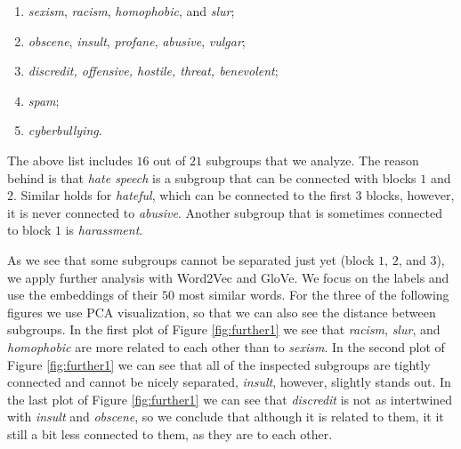 \documentclass[fleqn,moreauthors,10pt]{ds_report}
\begin{document}
\begin{enumerate}
  \item \textit{sexism}, \textit{racism}, \textit{homophobic}, and \textit{slur};
\vspace{-10pt} 
  \item \textit{obscene}, \textit{insult}, \textit{profane}, \textit{abusive}, \textit{vulgar};
\vspace{-10pt}
  \item \textit{discredit, offensive, hostile, threat, benevolent};
\vspace{-10pt}
  \item \textit{spam};
\vspace{-10pt}
  \item \textit{cyberbullying}.
\end{enumerate}

The above list includes $16$ out of $21$ subgroups that we analyze. The reason behind is that \textit{hate speech} is a subgroup that can be connected with blocks $1$ and $2$. Similar holds for \textit{hateful}, which can be connected to the first $3$ blocks, however, it is never connected to \textit{abusive}. Another subgroup that is sometimes connected to block $1$ is \textit{harassment}. 

As we see that some subgroups cannot be separated just yet (block $1$, $2$, and $3$), we apply further analysis with Word2Vec and GloVe. We focus on the labels and use the embeddings of their $50$ most similar words. For the three of the following figures we use PCA visualization, so that we can also see the distance between subgroups. In the first plot of Figure \ref{fig:further1} we see that \textit{racism}, \textit{slur}, and \textit{homophobic} are more related to each other than to \textit{sexism}. In the second plot of Figure \ref{fig:further1} we can see that all of the inspected subgroups are tightly connected and cannot be nicely separated, \textit{insult}, however, slightly stands out. In the last plot of Figure \ref{fig:further1} we can see that \textit{discredit} is not as intertwined with \textit{insult} and \textit{obscene}, so we conclude that although it is related to them, it it still a bit less connected to them, as they are to each other.
\end{document}
